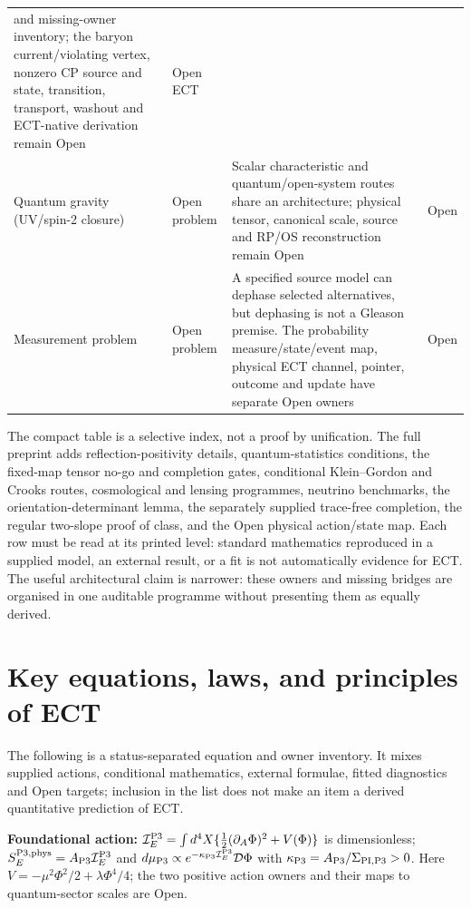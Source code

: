 \documentclass[11pt,a4paper]{article}
\begin{document}
\begin{longtable}{@{}p{4.5cm}p{2.5cm}p{4.7cm}p{2.2cm}@{}}
and missing-owner inventory;
the baryon current/violating vertex, nonzero CP source and state, transition,
transport, washout and ECT-native derivation remain Open & Open ECT \\
Quantum gravity (UV/spin-2 closure) & Open problem & Scalar characteristic and quantum/open-system routes share an architecture; physical tensor, canonical scale, source and RP/OS reconstruction remain Open & Open \\
Measurement problem & Open problem & A specified source model can dephase selected alternatives, but dephasing is not a Gleason premise.  The probability measure/state/event map, physical ECT channel, pointer, outcome and update have separate Open owners & Open \\
\end{longtable}

The compact table is a selective index, not a proof by unification.
The full preprint adds reflection-positivity details, quantum-statistics
conditions, the fixed-map tensor no-go and completion gates, conditional
Klein--Gordon and Crooks routes, cosmological and lensing programmes,
neutrino benchmarks, the orientation-determinant lemma, the separately
supplied trace-free completion, the regular two-slope proof of class, and the
Open physical action/state map.  Each row must be read at its printed level:
standard mathematics reproduced in a supplied model, an external result, or
a fit is not automatically evidence for ECT.  The useful architectural claim
is narrower: these owners and missing bridges are organised in one auditable
programme without presenting them as equally derived.

\section{Key equations, laws, and principles of ECT}

The following is a status-separated equation and owner inventory.  It mixes
supplied actions, conditional mathematics, external formulae, fitted
diagnostics and Open targets; inclusion in the list does not make an item a
derived quantitative prediction of ECT.

\textbf{Foundational action:}
$\mathcal I_E^{\rm P3}=\int d^4X\{
\frac12(\partial_A\Phi)^2+V(\Phi)\}$ is dimensionless;
$S_E^{{\rm P3},{\rm phys}}=A_{\rm P3}\mathcal I_E^{\rm P3}$ and
$d\mu_{\rm P3}\propto
e^{-\kappa_{\rm P3}\mathcal I_E^{\rm P3}}\mathcal D\Phi$ with
$\kappa_{\rm P3}=A_{\rm P3}/\Sigma_{\rm PI,P3}>0$.  Here
$V=-\mu^2\Phi^2/2+\lambda\Phi^4/4$; the two positive action owners and their
maps to quantum-sector scales are Open.
\end{document}
